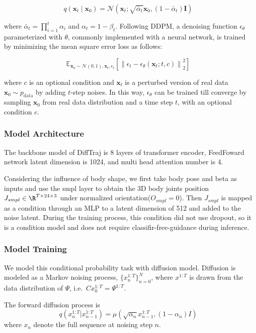 \documentclass{article}
\begin{document}
\[
q(\mathbf{x}_t \mid \mathbf{x}_0) = \mathcal{N}(\mathbf{x}_t; \sqrt{\bar{\alpha}_t}\mathbf{x}_0, (1 - \bar{\alpha}_t)\mathbf{I})
\]

where $\bar{\alpha}_t = \prod_{i=1}^t \alpha_i$ and $\alpha_t = 1 - \beta_t$. Following DDPM, a denoising function $\epsilon_\theta$ parameterized with $\theta$, commonly implemented with a neural network, is trained by minimizing the mean square error loss as follows:

\[
\mathbb{E}_{\mathbf{x}_0 \sim \mathcal{N}(0,1), \mathbf{x}_t, \epsilon_t}\left[ \left\| \epsilon_t - \epsilon_\theta(\mathbf{x}_t; t, c) \right\|_2^2 \right] 
\]

where $c$ is an optional condition and $\mathbf{x}_t$ is a perturbed version of real data $\mathbf{x}_0 \sim p_{\text{data}}$ by adding $t$-step noises. In this way, $\epsilon_\theta$ can be trained till converge by sampling $\mathbf{x}_0$ from real data distribution and a time step $t$, with an optional condition $c$.

\subsubsection{Model Architecture}\label{model-architecture}

The backbone model of DiffTraj is 8 layers of transformer encoder, FeedFoward network latent dimension is 1024, and multi head attention number is 4.

Considering the influence of body shape, we first take body pose and beta as inputs and use the smpl layer to obtain the 3D body joints position $J_{smpl} \in \R^{T \times 24 \times 3}$ under normalized orientation($O_{smpl}=0$). Then $J_{smpl}$ is mapped as a condition through an MLP to a latent dimension of 512 and added to the noise latent. During the training process, this condition did not use dropout, so it is a condition model and does not require classifir-free-guidance during inference.

\subsubsection{Model Training}\label{model-training}

We model this conditional probability task with diffusion model. Diffusion is modeled as a Markov noising process, ${\{x^{1:T}_n\}_{n=0}^N}$, where $x^{1:T}$ is drawn from the data distribution of $\Psi$, i.e.~$Cx^{1:T}_0=\Psi^{1:T}$.

The forward diffusion process is \[
q(x_{n}^{1:T}|x_{n-1}^{1:T}) = \mu(\sqrt{\alpha_n}x_{n-1}^{1:T}, (1-\alpha_n)I)
\] where $x_{n}$ denote the full sequence at noising step $n$.
\end{document}

